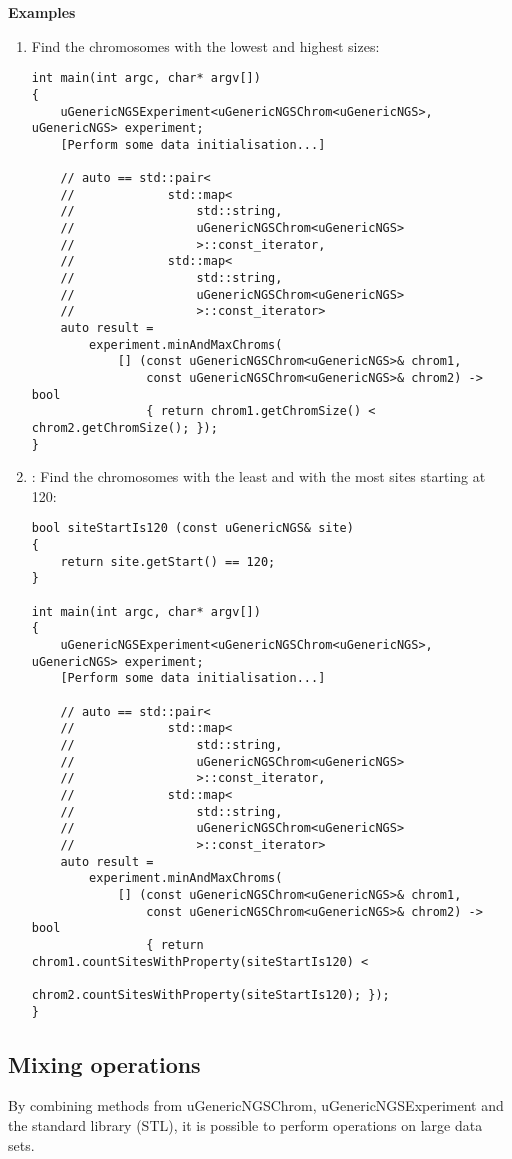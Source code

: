 \documentclass[letterpaper,10pt]{article}
\begin{document}
\bigskip
\noindent{}\textbf{Examples}
\begin{enumerate}
 \item Find the chromosomes with the lowest and highest sizes:
\begin{verbatim}
int main(int argc, char* argv[])
{
    uGenericNGSExperiment<uGenericNGSChrom<uGenericNGS>, uGenericNGS> experiment;
    [Perform some data initialisation...]

    // auto == std::pair<
    //             std::map<
    //                 std::string, 
    //                 uGenericNGSChrom<uGenericNGS>
    //                 >::const_iterator,
    //             std::map<
    //                 std::string, 
    //                 uGenericNGSChrom<uGenericNGS>
    //                 >::const_iterator>
    auto result =  
        experiment.minAndMaxChroms(
            [] (const uGenericNGSChrom<uGenericNGS>& chrom1, 
                const uGenericNGSChrom<uGenericNGS>& chrom2) -> bool
                { return chrom1.getChromSize() < chrom2.getChromSize(); });
}
\end{verbatim}

 \item : Find the chromosomes with the least and with the most sites starting at 120:
\begin{verbatim}
bool siteStartIs120 (const uGenericNGS& site)
{
    return site.getStart() == 120;
}

int main(int argc, char* argv[])
{
    uGenericNGSExperiment<uGenericNGSChrom<uGenericNGS>, uGenericNGS> experiment;
    [Perform some data initialisation...]

    // auto == std::pair<
    //             std::map<
    //                 std::string, 
    //                 uGenericNGSChrom<uGenericNGS>
    //                 >::const_iterator,
    //             std::map<
    //                 std::string, 
    //                 uGenericNGSChrom<uGenericNGS>
    //                 >::const_iterator>
    auto result =
        experiment.minAndMaxChroms(
            [] (const uGenericNGSChrom<uGenericNGS>& chrom1, 
                const uGenericNGSChrom<uGenericNGS>& chrom2) -> bool
                { return chrom1.countSitesWithProperty(siteStartIs120) < 
                         chrom2.countSitesWithProperty(siteStartIs120); });
}
\end{verbatim}
\end{enumerate}

\subsection{Mixing operations}
By combining methods from uGenericNGSChrom, uGenericNGSExperiment and the standard library (STL), it is possible to perform operations on large data sets.
\end{document}
